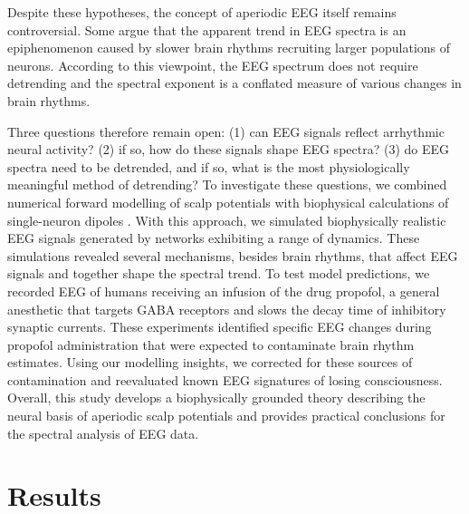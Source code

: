 Despite these hypotheses, the concept of aperiodic EEG itself remains controversial. Some argue that the apparent trend in EEG spectra is an epiphenomenon caused by slower brain rhythms recruiting larger populations of neurons\cite{Buzsaki2004, Buzsaki2023}. According to this viewpoint, the EEG spectrum does not require detrending and the spectral exponent is a conflated measure of various changes in brain rhythms. 

Three questions therefore remain open: (1) can EEG signals reflect arrhythmic neural activity? (2) if so, how do these signals shape EEG spectra? (3) do EEG spectra need to be detrended, and if so, what is the most physiologically meaningful method of detrending? To investigate these questions, we combined numerical forward modelling of scalp potentials with biophysical calculations of single-neuron dipoles \cite{Hagen2016,Huang2016, Næss2021}. With this approach, we simulated biophysically realistic EEG signals generated by networks exhibiting a range of dynamics. These simulations revealed several mechanisms, besides brain rhythms, that affect EEG signals and together shape the spectral trend. To test model predictions, we recorded EEG of humans receiving an infusion of the drug propofol, a general anesthetic that targets GABA receptors and slows the decay time of inhibitory synaptic currents\cite{Franks2008,Kitamura2003,Orser1994, Whittington1996}. These experiments identified specific EEG changes during propofol administration that were expected to contaminate brain rhythm estimates. Using our modelling insights, we corrected for these sources of contamination and reevaluated known EEG signatures of losing consciousness. Overall, this study develops a biophysically grounded theory describing the neural basis of aperiodic scalp potentials and provides practical conclusions for the spectral analysis of EEG data.

\section{Results}
